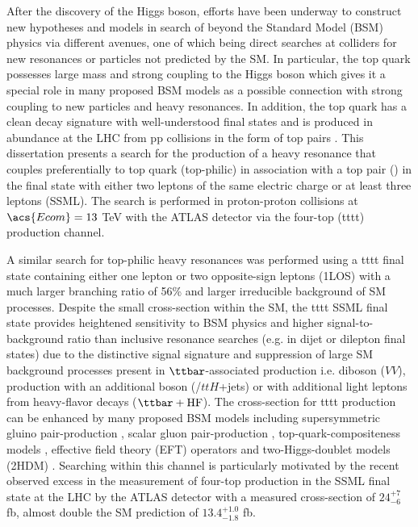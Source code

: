 \documentclass[../thesis.tex]{subfiles}
\begin{document}
After the discovery of the Higgs boson, efforts have been underway to construct new hypotheses and models in search of beyond the Standard Model (\acs{BSM}) physics via different avenues, one of which being direct searches at colliders for new resonances or particles not predicted by the \acs{SM}. In particular, the top quark possesses large mass and strong coupling to the Higgs boson \citep{theory:top_coupling} which gives it a special role in many proposed \acs{BSM} models as a possible connection with strong coupling to new particles and heavy resonances. In addition, the top quark has a clean decay signature with well-understood final states and is produced in abundance at the \acs{LHC} from \acs{pp} collisions in the form of top pairs \ttbar \citep{TOPQ-2018-39,Degrande_2011}. This dissertation presents a search for the production of a heavy resonance that couples preferentially to top quark (top-philic) in association with a top pair (\ttbar) in the final state with either two leptons of the same electric charge or at least three leptons (\acs{SSML}). The search is performed in proton-proton collisions at $\acs{Ecom}=13$ TeV with the \acs{ATLAS} detector \citep{atlas} via the four-top (\acs{tttt}) production channel.

A similar search for top-philic heavy resonances was performed using a \acs{tttt} final state containing either one lepton or two opposite-sign leptons (\acs{1LOS}) \citep{theory:ttZp_1los} with a much larger branching ratio of 56\% and larger irreducible background of \acs{SM} processes. Despite the small cross-section within the \acs{SM}, the \acs{tttt} \acs{SSML} final state provides heightened sensitivity to \acs{BSM} physics and higher signal-to-background ratio than inclusive resonance searches (e.g. in dijet or dilepton final states) due to the distinctive signal signature and suppression of large \acs{SM} background processes present in $\ttbar$-associated production i.e. diboson ($VV$), \ttbar production with an additional boson (\ttV/$ttH$+jets) or with additional light leptons from heavy-flavor decays ($\ttbar+\text{HF}$). The cross-section for \acs{tttt} production can be enhanced by many proposed \acs{BSM} models including supersymmetric gluino pair-production \citep{Nilles:1983ge,Farrar:1978xj}, scalar gluon pair-production \citep{Plehn_2009,Calvet_2013}, top-quark-compositeness models \citep{Pomarol_2008,Kumar_2009}, effective field theory (\acs{EFT}) operators \citep{Banelli_2021,Aoude_2022,Zhang_2018,Degrande_2011,Darm__2021} and two-Higgs-doublet models (\acs{2HDM}) \citep{Craig:2015jba,Craig_2017,Branco:2011iw,PhysRevD.93.075038,higgscomp}. Searching within this channel is particularly motivated by the recent observed excess in the measurement of four-top production in the \acs{SSML} final state at the \acs{LHC} by the \acs{ATLAS} detector \citep{tttt_obs} with a measured cross-section of $24^{+7}_{-6}$ fb, almost double the \acs{SM} prediction of $13.4^{+1.0}_{-1.8}$ fb.
\end{document}
